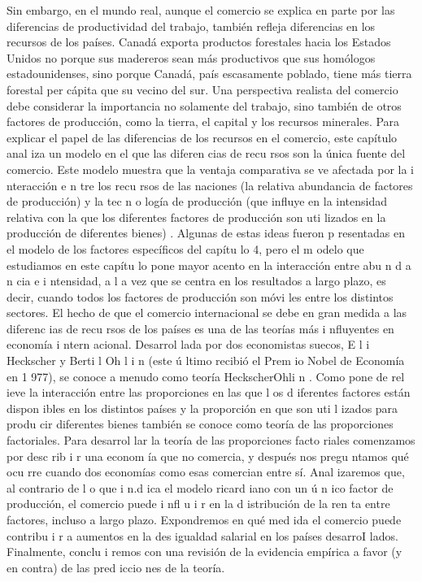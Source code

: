 \documentclass[10pt,a4paper]{article}
\begin{document}
Sin embargo, en el mundo real, aunque el comercio se explica en parte por las diferencias de productividad del trabajo, también refleja diferencias en los recursos de los países. Canadá exporta productos forestales hacia los Estados Unidos no porque sus madereros sean más productivos que sus homólogos estadounidenses, sino porque Canadá, país escasamente poblado, tiene más tierra forestal per cápita que su vecino del sur. Una perspectiva realista del comercio debe considerar la importancia no solamente del trabajo, sino también de otros factores de producción, como la tierra, el capital y los recursos minerales. Para explicar el papel de las diferencias de los recursos en el comercio, este capítulo anal iza un modelo en el que las diferen cias de recu rsos son la única fuente del comercio. Este modelo muestra que la ventaja comparativa se ve afectada por la i nteracción e n tre los recu rsos de las naciones (la relativa abundancia de factores de producción) y la tec n o logía de producción (que influye en la intensidad relativa con la que los diferentes factores de producción son uti lizados en la producción de diferentes bienes) . Algunas de estas ideas fueron p resentadas en el modelo de los factores específicos del capítu lo 4, pero el m odelo que estudiamos en este capítu lo pone mayor acento en la interacción entre abu n d a n cia e i ntensidad, a l a vez que se centra en los resultados a largo plazo, es decir, cuando todos los factores de producción son móvi les entre los distintos sectores. El hecho de que el comercio internacional se debe en gran medida a las diferenc ias de recu rsos de los países es una de las teorías más i nfluyentes en economía i ntern acional. Desarrol lada por dos economistas suecos, E l i Heckscher y Berti l Oh l i n (este ú ltimo recibió el Prem io Nobel de Economía en 1 977), se conoce a menudo como teoría HeckscherOhli n . Como pone de rel ieve la interacción entre las proporciones en las que l os d iferentes factores están dispon ibles en los distintos países y la proporción en que son uti l izados para produ cir diferentes bienes también se conoce como teoría de las proporciones factoriales. Para desarrol lar la teoría de las proporciones facto riales comenzamos por desc rib i r una econom ía que no comercia, y después nos pregu ntamos qué ocu rre cuando dos economías  como esas comercian entre sí. Anal izaremos que, al contrario de l o que i n.d ica el modelo ricard iano con un ú n ico factor de producción, el comercio puede i nfl u i r en la d istribución de la ren ta entre factores, incluso a largo plazo. Expondremos en qué med ida el comercio puede contribu i r a aumentos en la des igualdad salarial en los países desarroI lados. Finalmente, conclu i remos con una revisión de la evidencia empírica a favor (y en contra) de las pred iccio nes de la teoría.
\end{document}
